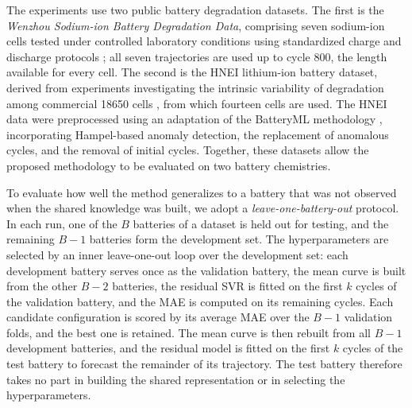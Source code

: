 \documentclass[conference]{IEEEtran}
\begin{document}

The experiments use two public battery degradation datasets. The first is the \textit{Wenzhou Sodium-ion Battery Degradation Data}, comprising seven sodium-ion cells tested under controlled laboratory conditions using standardized charge and discharge protocols \cite{He2026TransferSodium}; all seven trajectories are used up to cycle 800, the length available for every cell. The second is the HNEI lithium-ion battery dataset, derived from experiments investigating the intrinsic variability of degradation among commercial 18650 cells \cite{devie2018intrinsic}, from which fourteen cells are used. The HNEI data were preprocessed using an adaptation of the BatteryML methodology \cite{zhang2024batteryml,MicrosoftBatteryML}, incorporating Hampel-based anomaly detection, the replacement of anomalous cycles, and the removal of initial cycles. Together, these datasets allow the proposed methodology to be evaluated on two battery chemistries.

To evaluate how well the method generalizes to a battery that was not observed when the shared knowledge was built, we adopt a \textit{leave-one-battery-out} protocol. In each run, one of the $B$ batteries of a dataset is held out for testing, and the remaining $B-1$ batteries form the development set. The hyperparameters are selected by an inner leave-one-out loop over the development set: each development battery serves once as the validation battery, the mean curve is built from the other $B-2$ batteries, the residual SVR is fitted on the first $k$ cycles of the validation battery, and the MAE is computed on its remaining cycles. Each candidate configuration is scored by its average MAE over the $B-1$ validation folds, and the best one is retained. The mean curve is then rebuilt from all $B-1$ development batteries, and the residual model is fitted on the first $k$ cycles of the test battery to forecast the remainder of its trajectory. The test battery therefore takes no part in building the shared representation or in selecting the hyperparameters.
\end{document}
